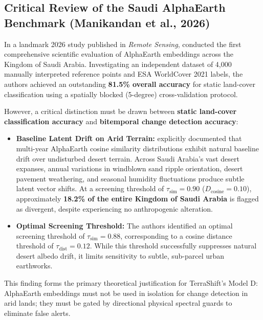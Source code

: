 \subsection{Critical Review of the Saudi AlphaEarth Benchmark (Manikandan et al., 2026)}
In a landmark 2026 study published in \textit{Remote Sensing}, \citet{manikandan2026alphaearth} conducted the first comprehensive scientific evaluation of AlphaEarth embeddings across the Kingdom of Saudi Arabia. Investigating an independent dataset of 4,000 manually interpreted reference points and ESA WorldCover 2021 labels, the authors achieved an outstanding \textbf{81.5\% overall accuracy} for static land-cover classification using a spatially blocked (5-degree) cross-validation protocol.

However, a critical distinction must be drawn between \textbf{static land-cover classification accuracy} and \textbf{bitemporal change detection accuracy}:
\begin{itemize}
    \item \textbf{Baseline Latent Drift on Arid Terrain:} \citet{manikandan2026alphaearth} explicitly documented that multi-year AlphaEarth cosine similarity distributions exhibit natural baseline drift over undisturbed desert terrain. Across Saudi Arabia's vast desert expanses, annual variations in windblown sand ripple orientation, desert pavement weathering, and seasonal humidity fluctuations produce subtle latent vector shifts. At a screening threshold of $\tau_{\text{sim}} = 0.90$ ($D_{\text{cosine}} = 0.10$), approximately \textbf{18.2\% of the entire Kingdom of Saudi Arabia} is flagged as divergent, despite experiencing no anthropogenic alteration.
    \item \textbf{Optimal Screening Threshold:} The authors identified an optimal screening threshold of $\tau_{\text{sim}} = 0.88$, corresponding to a cosine distance threshold of $\tau_{\text{dist}} = 0.12$. While this threshold successfully suppresses natural desert albedo drift, it limits sensitivity to subtle, sub-parcel urban earthworks.
\end{itemize}

This finding forms the primary theoretical justification for TerraShift's Model D: AlphaEarth embeddings must not be used in isolation for change detection in arid lands; they must be gated by directional physical spectral guards to eliminate false alerts.

